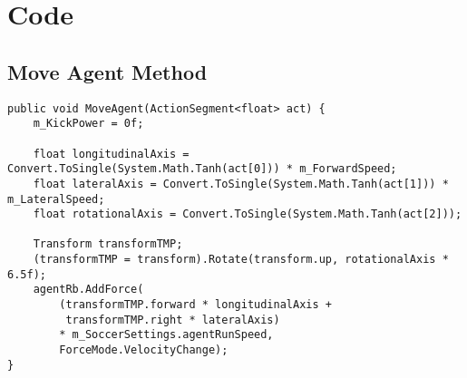 
\chapter{Code}\label{appendix:code}
\section{Move Agent Method}\label{appendix:code:move_agent}
\begin{lstlisting}[basicstyle=\footnotesize]
public void MoveAgent(ActionSegment<float> act) {
    m_KickPower = 0f;

    float longitudinalAxis = Convert.ToSingle(System.Math.Tanh(act[0])) * m_ForwardSpeed;
    float lateralAxis = Convert.ToSingle(System.Math.Tanh(act[1])) * m_LateralSpeed;
    float rotationalAxis = Convert.ToSingle(System.Math.Tanh(act[2]));

    Transform transformTMP;
    (transformTMP = transform).Rotate(transform.up, rotationalAxis * 6.5f);
    agentRb.AddForce(
        (transformTMP.forward * longitudinalAxis +
         transformTMP.right * lateralAxis)
        * m_SoccerSettings.agentRunSpeed,
        ForceMode.VelocityChange);
}
\end{lstlisting}

